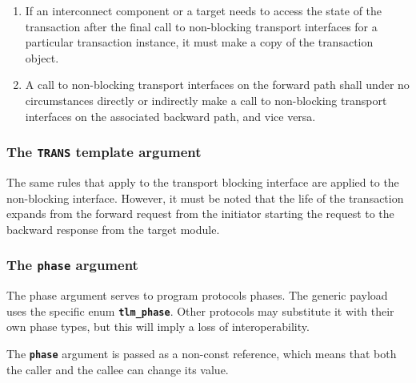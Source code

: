 {\begin{enumerate}
	In other words, if the final call to non-blocking transport interfaces is from target to initiator, the target has a chance to inspect the state of the transaction object before it yields control. 
	After that, any interconnect component or target must assume that the transaction object is invalid.
	\item If an interconnect component or a target needs to access the state of the transaction after the final call to non-blocking transport interfaces for a particular transaction instance, it must make a copy of the transaction object.
	\item A call to non-blocking transport interfaces on the forward path shall under no circumstances directly or indirectly make a call to non-blocking transport interfaces on the associated backward path, and vice versa.
\end{enumerate}

\subsubsection{The \texttt{TRANS} template argument}
The same rules that apply to the transport blocking interface are applied to the non-blocking interface.
However, it must be noted that the life of the transaction expands from the forward request from the initiator starting the request to the backward response from the target module.

\subsubsection{The \texttt{phase} argument}
The phase argument serves to program protocols phases.
The generic payload uses the specific enum \texttt{\textbf{tlm\_phase}}.
Other protocols may substitute it with their own phase types, but this will imply a loss of interoperability.

The \texttt{\textbf{phase}} argument is passed as a non-const reference, which means that both the caller and the callee can change its value.

}
